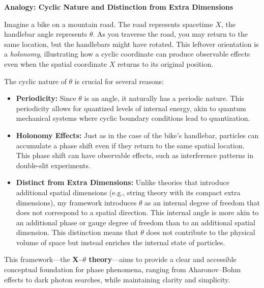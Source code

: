 \textbf{Analogy: Cyclic Nature and Distinction from Extra Dimensions}

Imagine a bike on a mountain road. The road represents spacetime $X$,
the handlebar angle represents $\theta$. As you traverse the road, you may return to the same location, but the handlebars might have rotated. This leftover orientation is a \emph{holonomy}, illustrating how a cyclic coordinate can produce observable effects even when the spatial coordinate $X$ returns to its original position.

The cyclic nature of $\theta$ is crucial for several reasons:
\begin{itemize}
  \item \textbf{Periodicity:} Since $\theta$ is an angle, it naturally has a periodic nature. This periodicity allows for quantized levels of internal energy, akin to quantum mechanical systems where cyclic boundary conditions lead to quantization.
  \item \textbf{Holonomy Effects:} Just as in the case of the bike's handlebar, particles can accumulate a phase shift even if they return to the same spatial location. This phase shift can have observable effects, such as interference patterns in double-slit experiments.
  \item \textbf{Distinct from Extra Dimensions:} Unlike theories that introduce additional spatial dimensions (e.g., string theory with its compact extra dimensions), my framework introduces $\theta$ as an internal degree of freedom that does not correspond to a spatial direction. This internal angle is more akin to an additional phase or gauge degree of freedom than to an additional spatial dimension. This distinction means that $\theta$ does not contribute to the physical volume of space but instead enriches the internal state of particles.
\end{itemize}

This framework---the \textbf{X--$\theta$ theory}---aims to provide a clear and accessible conceptual foundation for phase phenomena, ranging from Aharonov--Bohm effects to dark photon searches, while maintaining clarity and simplicity.
